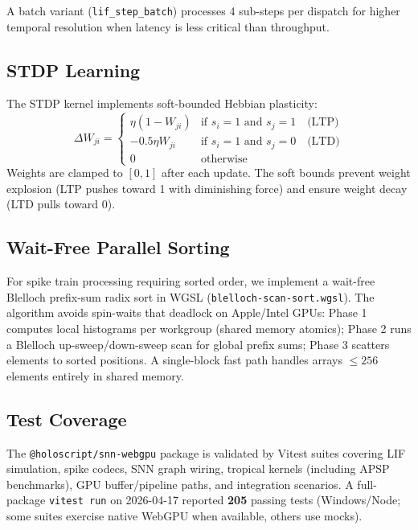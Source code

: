 \documentclass[10pt]{article}
\makeatletter
\newcommand{\snnwebgpu}{\texttt{@holoscript/snn-webgpu}}
\makeatother
\begin{document}
A batch variant (\texttt{lif\_step\_batch}) processes 4 sub-steps per dispatch
for higher temporal resolution when latency is less critical than throughput.

\subsection{STDP Learning}

The STDP kernel implements soft-bounded Hebbian plasticity:
\begin{equation}
\Delta W_{ji} = \begin{cases}
\eta (1 - W_{ji}) & \text{if } s_i = 1 \text{ and } s_j = 1 \quad \text{(LTP)} \\
-0.5\eta W_{ji}  & \text{if } s_i = 1 \text{ and } s_j = 0 \quad \text{(LTD)} \\
0                 & \text{otherwise}
\end{cases}
\end{equation}
Weights are clamped to $[0, 1]$ after each update.
The soft bounds prevent weight explosion (LTP pushes toward 1 with diminishing force)
and ensure weight decay (LTD pulls toward 0).

\subsection{Wait-Free Parallel Sorting}

For spike train processing requiring sorted order, we implement a wait-free
Blelloch prefix-sum radix sort in WGSL (\texttt{blelloch-scan-sort.wgsl}).
The algorithm avoids spin-waits that deadlock on Apple/Intel GPUs:
Phase 1 computes local histograms per workgroup (shared memory atomics);
Phase 2 runs a Blelloch up-sweep/down-sweep scan for global prefix sums;
Phase 3 scatters elements to sorted positions.
A single-block fast path handles arrays $\leq 256$ elements entirely in
shared memory.

\subsection{Test Coverage}

The \snnwebgpu{} package is validated by Vitest suites covering
LIF simulation, spike codecs, SNN graph wiring, tropical kernels (including APSP
benchmarks), GPU buffer/pipeline paths, and integration scenarios.
A full-package \texttt{vitest run} on 2026-04-17 reported \textbf{205} passing tests
(Windows/Node; some suites exercise native WebGPU when available, others use mocks).
\end{document}
